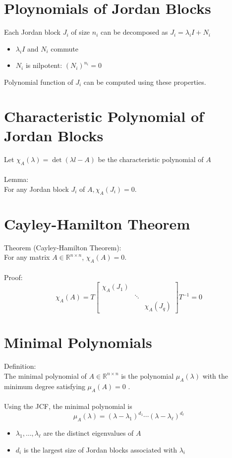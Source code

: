 \documentclass[10pt,a4paper,oneside]{article}
\begin{document}
\section{Ploynomials of Jordan Blocks}
Each Jordan block $J_{i}$ of size $n_{i}$ can be decomposed as $J_{i}=\lambda_{i} I+N_{i}$
\begin{itemize}
\item $\lambda_{i} I$ and $N_{i}$ commute
\item $N_{i}$ is nilpotent: $\left(N_{i}\right)^{n_{i}}=0$
\end{itemize}
Polynomial function of $J_{i}$ can be computed using these properties.
\section{Characteristic Polynomial of Jordan Blocks}
Let $\chi_{A}(\lambda)=\operatorname{det}(\lambda l-A)$ be the characteristic polynomial of $A$\\
\\
Lemma:\\
For any Jordan block $J_{i}$ of $A, \chi_{A}\left(J_{i}\right)=0$.
\section{Cayley-Hamilton Theorem}
Theorem (Cayley-Hamilton Theorem):\\
For any matrix $A\in \mathbb{R}^{n\times n}$, $\chi_{A}(A)=0$.\\
\\
Proof:\\
\[
\chi_{A}(A)=T\left[\begin{array}{ccc}{\chi_{A}\left(J_{1}\right)} & {} & {} \\ {} & {\ddots} & {} \\ {} & {} & {\chi_{A}\left(J_{q}\right)}\end{array}\right] T^{-1}=0
\]
\section{Minimal Polynomials}
Definition:\\
The minimal polynomial of $A \in \mathbb{R}^{n \times n}$ is the polynomial $\mu_{A}(\lambda)$ with the minimum degree satisfying $\mu_{A}(A)=0$ .\\
\\
Using the JCF, the minimal polynomial is
\[
\mu_{A}(\lambda)=\left(\lambda-\lambda_{1}\right)^{d_{1}} \cdots\left(\lambda-\lambda_{\ell}\right)^{d_{\ell}}
\]
\begin{itemize}
\item $\lambda_{1}, \ldots, \lambda_{\ell}$ are the distinct eigenvalues of $A$
\item $d_{i}$ is the largest size of Jordan blocks associated with $\lambda_{i}$
\end{itemize}
\end{document}
